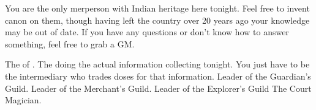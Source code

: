 \documentclass[char]{NeptuneBall}
\begin{document}
\begin{itemz}[Notes]
  \item You are the only merperson with Indian heritage here tonight. Feel free to invent canon on them, though having left the country over 20 years ago your knowledge may be out of date. If you have any questions or don't know how to answer something, feel free to grab a GM.
\end{itemz}


\begin{contacts}
  \contact{\cKing{}} The \cKing{\King} of \pAtlantis{}.
	\contact{\cWillow{}} The \cWillow{\kid} doing the actual information collecting tonight. You just have to be the intermediary who trades \iDrug{} doses for that information.
  \contact{\cGeneral{}} Leader of the Guardian's Guild.
  \contact{\cSlave{}} Leader of the Merchant's Guild.
  \contact{\cPriest{}} Leader of the Explorer's Guild
  \contact{\cManta{}} The Court Magician.
\end{contacts}
\end{document}
